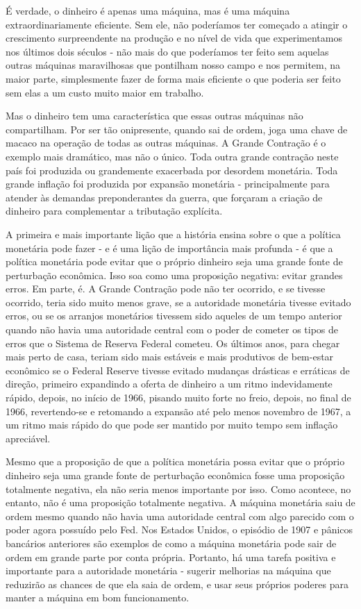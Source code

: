 \documentclass[12pt]{article}
\begin{document}
É verdade, o dinheiro é apenas uma máquina, mas é uma máquina extraordinariamente eficiente. Sem ele, não poderíamos ter começado a atingir o crescimento surpreendente na produção e no nível de vida que experimentamos nos últimos dois séculos - não mais do que poderíamos ter feito sem aquelas outras máquinas maravilhosas que pontilham nosso campo e nos permitem, na maior parte, simplesmente fazer de forma mais eficiente o que poderia ser feito sem elas a um custo muito maior em trabalho.

Mas o dinheiro tem uma característica que essas outras máquinas não compartilham. Por ser tão onipresente, quando sai de ordem, joga uma chave de macaco na operação de todas as outras máquinas. A Grande Contração é o exemplo mais dramático, mas não o único. Toda outra grande contração neste país foi produzida ou grandemente exacerbada por desordem monetária. Toda grande inflação foi produzida por expansão monetária - principalmente para atender às demandas preponderantes da guerra, que forçaram a criação de dinheiro para complementar a tributação explícita.

A primeira e mais importante lição que a história ensina sobre o que a política monetária pode fazer - e é uma lição de importância mais profunda - é que a política monetária pode evitar que o próprio dinheiro seja uma grande fonte de perturbação econômica. Isso soa como uma proposição negativa: evitar grandes erros. Em parte, é. A Grande Contração pode não ter ocorrido, e se tivesse ocorrido, teria sido muito menos grave, se a autoridade monetária tivesse evitado erros, ou se os arranjos monetários tivessem sido aqueles de um tempo anterior quando não havia uma autoridade central com o poder de cometer os tipos de erros que o Sistema de Reserva Federal cometeu. Os últimos anos, para chegar mais perto de casa, teriam sido mais estáveis e mais produtivos de bem-estar econômico se o Federal Reserve tivesse evitado mudanças drásticas e erráticas de direção, primeiro expandindo a oferta de dinheiro a um ritmo indevidamente rápido, depois, no início de 1966, pisando muito forte no freio, depois, no final de 1966, revertendo-se e retomando a expansão até pelo menos novembro de 1967, a um ritmo mais rápido do que pode ser mantido por muito tempo sem inflação apreciável.

Mesmo que a proposição de que a política monetária possa evitar que o próprio dinheiro seja uma grande fonte de perturbação econômica fosse uma proposição totalmente negativa, ela não seria menos importante por isso. Como acontece, no entanto, não é uma proposição totalmente negativa. A máquina monetária saiu de ordem mesmo quando não havia uma autoridade central com algo parecido com o poder agora possuído pelo Fed. Nos Estados Unidos, o episódio de 1907 e pânicos bancários anteriores são exemplos de como a máquina monetária pode sair de ordem em grande parte por conta própria. Portanto, há uma tarefa positiva e importante para a autoridade monetária - sugerir melhorias na máquina que reduzirão as chances de que ela saia de ordem, e usar seus próprios poderes para manter a máquina em bom funcionamento.
\end{document}
